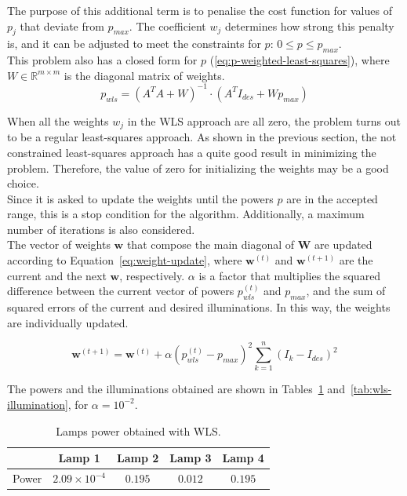 \documentclass[11pt,a4paper]{article}
\begin{document}
The purpose of this additional term is to penalise the cost function for values of $p_j$ that deviate from $p_{max}$. The coefficient $w_j$ determines how strong this penalty is, and it can be adjusted to meet the constraints for $p$: $0 \leq p \leq p_{max}$.\\

This problem also has a closed form for $p$ (\ref{eq:p-weighted-least-squares}), where $W \in \mathbb{R}^{m \times m}$ is the diagonal matrix of weights.
\begin{equation}
    p_{wls} = (A^T A + W)^{-1} \cdot (A^T I_{des} + W p_{max})
    \label{eq:p-weighted-least-squares}
\end{equation}

When all the weights $w_j$ in the WLS approach are all zero, the problem turns out to be a regular least-squares approach. As shown in the previous section, the not constrained least-squares approach has a quite good result in minimizing the problem. Therefore, the value of zero for initializing the weights may be a good choice.\\

Since it is asked to update the weights until the powers $p$ are in the accepted range, this is a stop condition for the algorithm. Additionally, a maximum number of iterations is also considered. \\

The vector of weights $\mathbf{w}$ that compose the main diagonal of $\mathbf{W}$ are updated according to Equation~\ref{eq:weight-update}, where $\mathbf{w}^{(t)}$ and $\mathbf{w}^{(t+1)}$ are the current and the next $\mathbf{w}$, respectively. $\alpha$ is a factor that multiplies the squared difference between the current vector of powers $p_{wls}^{(t)}$ and $p_{max}$, and the sum of squared errors of the current and desired illuminations. In this way, the weights are individually updated.

\begin{equation}
    \mathbf{w}^{(t+1)} = \mathbf{w}^{(t)} + \alpha (p_{wls}^{(t)} - p_{max})^2 \sum_{k=1}^{n}{(I_k - I_{des})^2}
    \label{eq:weight-update}
\end{equation}

The powers and the illuminations obtained are shown in Tables~\ref{tab:wls-powers} and~\ref{tab:wls-illumination}, for $\alpha=10^{-2}$.

\begin{table}[!htb]
    \centering
    \caption{Lamps power obtained with WLS.}
    \begin{tabular}{lcccc}
        \hline
        & Lamp 1 & Lamp 2 & Lamp 3 & Lamp 4\\
        \hline
        Power & $2.09\times 10 ^{-4}$ & $0.195$ & $0.012$ & $0.195$\\
        \hline
    \end{tabular}\label{tab:wls-powers}
\end{table}
\end{document}
